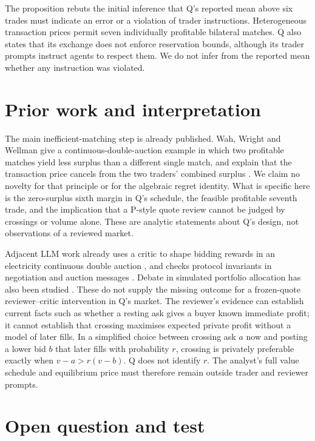 \documentclass{article}
\begin{document}
The proposition rebuts the initial inference that Q's reported mean above six trades must indicate an
error or a violation of trader instructions. Heterogeneous transaction prices permit seven individually
profitable bilateral matches. Q also states that its exchange does not enforce reservation bounds,
although its trader prompts instruct agents to respect them. We do not infer from the reported mean
whether any instruction was violated.

\section{Prior work and interpretation}

The main inefficient-matching step is already published. Wah, Wright and Wellman give a
continuous-double-auction example in which two profitable matches yield less surplus than a different
single match, and explain that the transaction price cancels from the two traders' combined surplus
\cite{wah2017}. We claim no novelty for that principle or for the algebraic regret identity. What is
specific here is the zero-surplus sixth margin in Q's schedule, the feasible profitable seventh trade, and
the implication that a P-style quote review cannot be judged by crossings or volume alone. These are
analytic statements about Q's design, not observations of a reviewed market.

Adjacent LLM work already uses a critic to shape bidding rewards in an electricity continuous double
auction \cite{jadhav2025}, and checks protocol invariants in negotiation and auction messages
\cite{albayaydh2026}. Debate in simulated portfolio allocation has also been studied \cite{huang2026}.
These do not supply the missing outcome for a frozen-quote reviewer--critic intervention in Q's market.
The reviewer's evidence can establish current facts such as whether a resting ask gives a buyer known
immediate profit; it cannot establish that crossing maximises expected private profit without a model of
later fills. In a simplified choice between crossing ask \(a\) now and posting a lower bid \(b\) that
later fills with probability \(r\), crossing is privately preferable exactly when \(v-a>r(v-b)\). Q does
not identify \(r\). The analyst's full value schedule and equilibrium price must therefore remain outside
trader and reviewer prompts.

\section{Open question and test}
\end{document}
